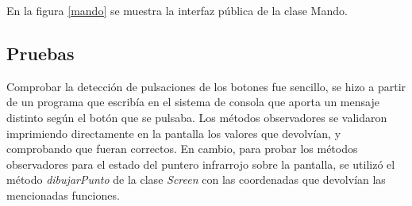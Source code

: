 En la figura \ref{mando} se muestra la interfaz pública de la clase Mando.\\


\subsection{Pruebas}

Comprobar la detección de pulsaciones de los botones fue sencillo, se hizo a partir de un programa que escribía en el sistema de consola que aporta  un mensaje distinto según el botón que se pulsaba. Los métodos observadores se validaron imprimiendo directamente en la pantalla los valores que devolvían, y comprobando que fueran correctos. En cambio, para probar los métodos observadores para el estado del puntero infrarrojo sobre la pantalla, se utilizó el método \emph{dibujarPunto} de la clase \emph{Screen} con las coordenadas que devolvían las mencionadas funciones.

